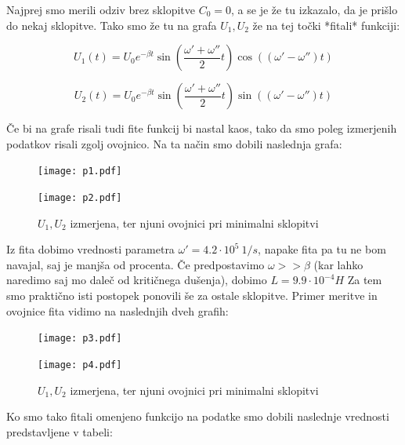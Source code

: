 \documentclass[12pt]{article}
\begin{document}
Najprej smo merili odziv brez sklopitve $C_0 = 0$, a se je že tu izkazalo, da je prišlo do nekaj sklopitve. Tako smo že tu na grafa $U_1, U_2$ že na tej točki *fitali* funkciji:

$$U_1(t) = U_0 e^{-\beta t} \sin \left(\frac{\omega ' + \omega''}{2}t\right)\cos\left((\omega'-\omega'')t\right)$$

$$U_2(t) = U_0 e^{-\beta t} \sin \left(\frac{\omega ' + \omega''}{2}t\right)\sin\left((\omega'-\omega'')t\right)$$

Če bi na grafe risali tudi fite funkcij bi nastal kaos, tako da smo poleg izmerjenih podatkov risali zgolj ovojnico. Na ta način smo dobili naslednja grafa:
\newpage

\begin{figure}[h]
\centering
\begin{minipage}[t]{0.45\textwidth}
    \texttt{[image: p1.pdf]}

\end{minipage}
\hfill
\begin{minipage}[t]{0.45\textwidth}
    \texttt{[image: p2.pdf]}

\end{minipage}
\caption{$U_1, U_2$ izmerjena, ter njuni ovojnici pri minimalni sklopitvi}
\end{figure}

Iz fita dobimo vrednosti parametra $\omega' = 4.2\cdot 10^5 \ 1/s$, napake fita pa tu ne bom navajal, saj je manjša od procenta. Če predpostavimo $\omega >> \beta$ (kar lahko naredimo saj mo daleč od kritičnega dušenja), dobimo $L = 9.9\cdot 10^{-4} H$ Za tem smo praktično isti postopek ponovili še za ostale sklopitve. Primer meritve in ovojnice fita vidimo na naslednjih dveh grafih:

\begin{figure}[h]
\centering
\begin{minipage}[t]{0.45\textwidth}
    \texttt{[image: p3.pdf]}

\end{minipage}
\hfill
\begin{minipage}[t]{0.45\textwidth}
    \texttt{[image: p4.pdf]}

\end{minipage}
\caption{$U_1, U_2$ izmerjena, ter njuni ovojnici pri minimalni sklopitvi}
\end{figure}
Ko smo tako fitali omenjeno funkcijo na podatke smo dobili naslednje vrednosti predstavljene v tabeli:
\end{document}

